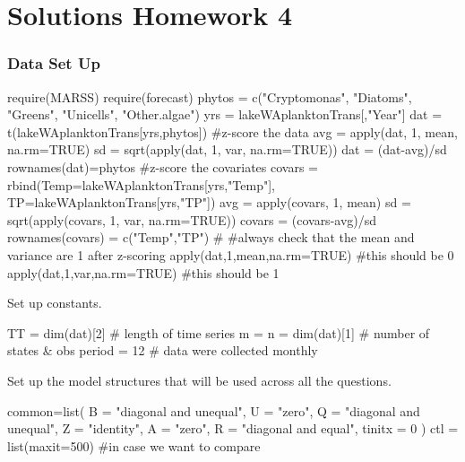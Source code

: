 

\setcounter{MaxMatrixCols}{20}
\usepackage{enumerate}
\usepackage{Sweave}





\chapter*{Solutions Homework 4}

\subsection*{Data Set Up}
\begin{Schunk}
\begin{Sinput}
 require(MARSS)
 require(forecast)
 phytos = c("Cryptomonas", "Diatoms", "Greens",
             "Unicells", "Other.algae")
 yrs = lakeWAplanktonTrans[,"Year"]%in%1985:1994
 dat = t(lakeWAplanktonTrans[yrs,phytos])
 #z-score the data
 avg = apply(dat, 1, mean, na.rm=TRUE)
 sd = sqrt(apply(dat, 1, var, na.rm=TRUE))
 dat = (dat-avg)/sd
 rownames(dat)=phytos
 #z-score the covariates
 covars = rbind(Temp=lakeWAplanktonTrans[yrs,"Temp"],
                TP=lakeWAplanktonTrans[yrs,"TP"])
 avg = apply(covars, 1, mean)
 sd = sqrt(apply(covars, 1, var, na.rm=TRUE))
 covars =  (covars-avg)/sd
 rownames(covars) = c("Temp","TP")
 #
 #always check that the mean and variance are 1 after z-scoring
 apply(dat,1,mean,na.rm=TRUE) #this should be 0
 apply(dat,1,var,na.rm=TRUE) #this should be 1
\end{Sinput}
\end{Schunk}
Set up constants.
\begin{Schunk}
\begin{Sinput}
 TT = dim(dat)[2] # length of time series
 m = n = dim(dat)[1] # number of states & obs
 period = 12 # data were collected monthly
\end{Sinput}
\end{Schunk}
Set up the model structures that will be used across all the questions.
\begin{Schunk}
\begin{Sinput}
 common=list(
   B = "diagonal and unequal",
   U = "zero",
   Q = "diagonal and unequal",
   Z = "identity",
   A = "zero",
   R = "diagonal and equal",
   tinitx = 0
 )
 ctl = list(maxit=500) #in case we want to compare
\end{Sinput}
\end{Schunk}

